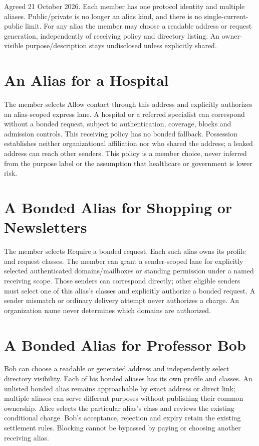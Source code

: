 \documentclass[11pt]{article}
\begin{document}
Agreed 21 October 2026. Each member has one protocol identity and multiple aliases.
Public/private is no longer an alias kind, and there is no single-current-public
limit. For any alias the member may choose a readable address or request generation,
independently of receiving policy and directory listing. An owner-visible
purpose/description stays undisclosed unless explicitly shared.

\section{An Alias for a Hospital}

The member selects Allow contact through this address and explicitly authorizes
an alias-scoped express lane. A hospital or a referred specialist can correspond
without a bonded request, subject to authentication, coverage, blocks and admission
controls. This receiving policy has no bonded fallback. Possession establishes
neither organizational affiliation nor who shared the address; a leaked address
can reach other senders. This policy is a member choice, never inferred from the
purpose label or the assumption that healthcare or government is lower risk.

\section{A Bonded Alias for Shopping or Newsletters}

The member selects Require a bonded request. Each such alias owns its profile and
request classes. The member can grant a sender-scoped lane for explicitly selected
authenticated domains/mailboxes or standing permission under a named receiving
scope. Those senders can correspond directly; other eligible senders must select
one of this alias's classes and explicitly authorize a bonded request. A sender
mismatch or ordinary delivery attempt never authorizes a charge. An organization
name never determines which domains are authorized.

\section{A Bonded Alias for Professor Bob}

Bob can choose a readable or generated address and independently select directory
visibility. Each of his bonded aliases has its own profile and classes. An unlisted
bonded alias remains approachable by exact address or direct link; multiple aliases
can serve different purposes without publishing their common ownership. Alice
selects the particular alias's class and reviews the existing conditional charge.
Bob's acceptance, rejection and expiry retain the existing settlement rules.
Blocking cannot be bypassed by paying or choosing another receiving alias.
\end{document}
